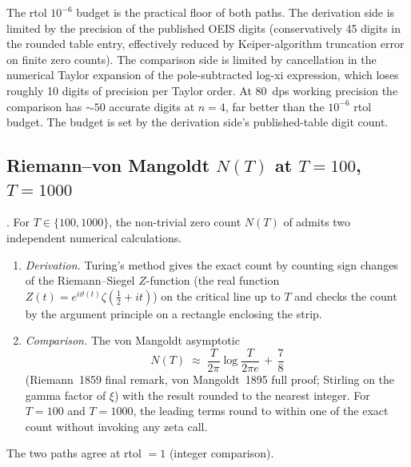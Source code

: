 \begin{remark}
\label{v4-arith:w6-h:rem:li-floor}
The rtol \(10^{-6}\) budget is the practical floor of both paths.
The derivation side is limited by the precision of the published
OEIS digits (conservatively 45 digits in the rounded table entry,
effectively reduced by Keiper-algorithm truncation error on finite
zero counts). The comparison side is limited by cancellation
in the numerical Taylor expansion of the pole-subtracted log-xi expression,
which loses roughly 10 digits of precision per Taylor order. At
80~dps working precision the comparison has \(\sim50\) accurate
digits at \(n=4\), far better than the \(10^{-6}\) rtol budget.
The budget is set by the derivation side's published-table digit
count.
\end{remark}

\subsection{Riemann--von Mangoldt \(N(T)\) at \(T=100\), \(T=1000\)}
\label{v4-arith:w6-h:N-T}

\begin{theorem}[\(N(T)\) comparison]
\label{v4-arith:w6-h:thm:N-T-rvm}
\ClaimStatusProvedHere. For \(T\in\{100,1000\}\), the non-trivial
zero count \(N(T)\) of  admits two
independent numerical calculations.
\begin{enumerate}
\item[(D)] \emph{Derivation.} Turing's method gives the exact count by
counting sign changes of the
Riemann--Siegel \(Z\)-function (the real function
\(Z(t)=e^{i\vartheta(t)}\zeta(\tfrac{1}{2}+it)\)) on the critical
line up to \(T\) and checks the count by the argument principle on
a rectangle enclosing the strip.
\item[(C)] \emph{Comparison.} The von Mangoldt asymptotic
\begin{equation}
\label{v4-arith:w6-h:eq:rvm-asym}
N(T)\;\approx\;\frac{T}{2\pi}\log\!\frac{T}{2\pi e}\,+\,\frac{7}{8}
\end{equation}
(Riemann~1859 final remark, von Mangoldt~1895 full proof; Stirling
on the gamma factor of \(\xi\)) with the result rounded to the
nearest integer. For \(T=100\) and \(T=1000\), the leading terms
round to within one of the exact count without invoking any zeta
call.
\end{enumerate}
The two paths agree at rtol \(=1\) (integer comparison).
\end{theorem}

